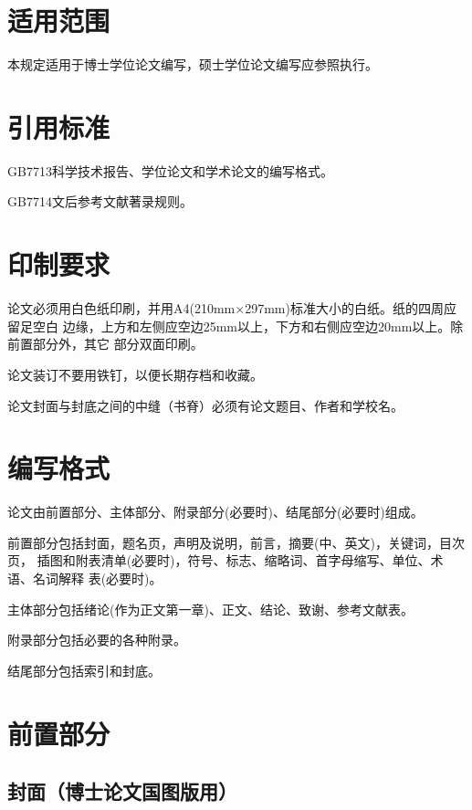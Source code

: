 \documentclass[oneside, phd]{njuthesis}
\begin{document}
\section{适用范围}

本规定适用于博士学位论文编写，硕士学位论文编写应参照执行。

\section{引用标准}

GB7713科学技术报告、学位论文和学术论文的编写格式。

GB7714文后参考文献著录规则。

\section{印制要求}

论文必须用白色纸印刷，并用A4(210mm×297mm)标准大小的白纸。纸的四周应留足空白
边缘，上方和左侧应空边25mm以上，下方和右侧应空边20mm以上。除前置部分外，其它
部分双面印刷。

论文装订不要用铁钉，以便长期存档和收藏。

论文封面与封底之间的中缝（书脊）必须有论文题目、作者和学校名。

\section{编写格式}

论文由前置部分、主体部分、附录部分(必要时)、结尾部分(必要时)组成。

前置部分包括封面，题名页，声明及说明，前言，摘要(中、英文)，关键词，目次页，
插图和附表清单(必要时)，符号、标志、缩略词、首字母缩写、单位、术语、名词解释
表(必要时)。

主体部分包括绪论(作为正文第一章)、正文、结论、致谢、参考文献表。

附录部分包括必要的各种附录。

结尾部分包括索引和封底。

\section{前置部分}


\subsection{封面（博士论文国图版用）}
\end{document}
